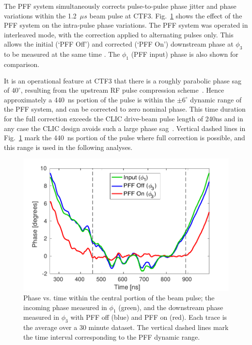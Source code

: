 \documentclass[%
 reprint,
 superscriptaddress,
 amsmath,
 amssymb,
 prl,
]{revtex4-1}
\begin{document}
The PFF system simultaneously corrects pulse-to-pulse phase jitter and phase 
variations within the 1.2~\(\mu s\) beam pulse at CTF3. 
Fig.~\ref{fig:shape} shows the effect of the PFF system on the intra-pulse 
phase variations. The PFF system was operated in interleaved mode, with 
the correction applied to alternating pulses only. This allows 
the initial (`PFF Off') and corrected (`PFF On') downstream phase at \(\phi_3\)
to be measured at the same time . The \(\phi_1\) (PFF input) phase 
is also shown for comparison. 

It is an operational feature at CTF3 that there is a roughly parabolic phase 
sag of \(40^\circ\), resulting from the upstream RF pulse compression 
scheme~\cite{CLICCDR}. Hence approximately a 440~ns portion of the pulse is 
within the \(\pm 6^\circ\) dynamic range of the PFF system, and can be 
corrected to zero nominal phase. 
This time duration for the full correction exceeds the CLIC drive-beam pulse 
length of 240ns and in any case the CLIC design avoids such 
a large phase sag~\cite{CLICCDR}. 
Vertical dashed lines in Fig.~\ref{fig:shape} mark the 440~ns portion of 
the pulse where full correction is possible, and this range is used in the 
following analyses. 

\begin{figure}
	\includegraphics[width=\columnwidth]{figs/shape}
	\caption{\label{fig:shape}Phase vs. time within the central portion of the  
	beam pulse; the incoming phase measured in \(\phi_1\) 
	(green), and the downstream phase measured in \(\phi_3\) with PFF off 
	(blue) and PFF on (red). Each trace is the average over a 30 minute dataset.
	The vertical dashed lines mark the time interval corresponding to the PFF 
	dynamic range. }
\end{figure}
\end{document}
